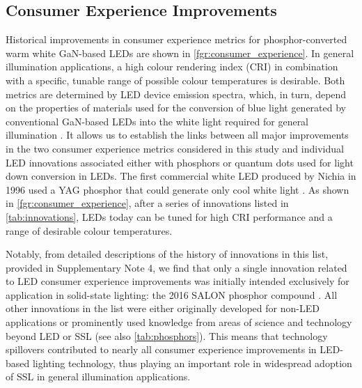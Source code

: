 \documentclass[parskip=full]{article}
\begin{document}
\subsection{Consumer Experience Improvements}

Historical improvements in consumer experience metrics for phosphor-converted warm white GaN-based LEDs are shown in \cref{fgr:consumer_experience}. In general illumination applications, a high colour rendering index (CRI) in combination with a specific, tunable range of possible colour temperatures is desirable. Both metrics are determined by LED device emission spectra, which, in turn, depend on the properties of materials used for the conversion of blue light generated by conventional GaN-based LEDs into the white light required for general illumination . It allows us to establish the links between all major improvements in the two consumer experience metrics considered in this study and individual LED innovations  associated either with phosphors or quantum dots used for light down conversion in LEDs. The first commercial white LED produced by Nichia in 1996 used a YAG phosphor that could generate only cool white light \cite{bando1998development}. As shown in \cref{fgr:consumer_experience}, after a series of innovations listed in \cref{tab:innovations}, LEDs today can be tuned for high CRI performance and a range of desirable colour temperatures.  

Notably, from detailed descriptions of the history of innovations in this list, provided in Supplementary Note 4, we find that only a single innovation related to LED consumer experience improvements was initially intended exclusively for application in solid-state lighting: the 2016 SALON phosphor compound \cite{Hoerder2019,seibald2019phosphor}. All other innovations in the list were either originally developed for non-LED applications or prominently used knowledge from areas of science and technology beyond LED or SSL (see also \cref{tab:phosphors}). This means that technology spillovers contributed to nearly all consumer experience improvements in LED-based lighting technology, thus playing an important role in widespread adoption of SSL in general illumination applications. 
\end{document}
